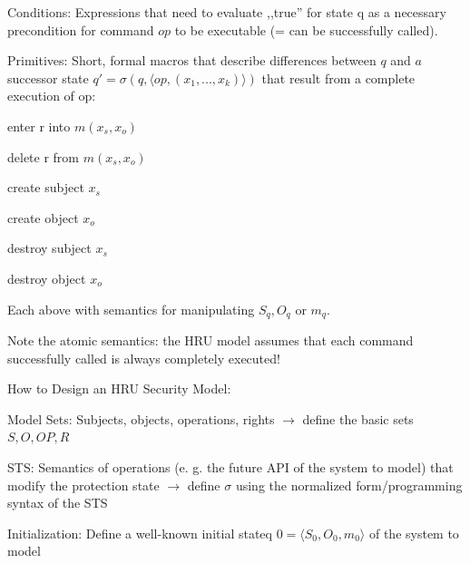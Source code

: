 \documentclass[a4paper]{article}
\begin{document}
\begin{multicols}{3}
    Conditions: Expressions that need to evaluate ,,true'' for state q as a necessary precondition for command $op$ to be executable (= can be successfully called).

    Primitives: Short, formal macros that describe differences between $q$ and $a$ successor state $q'=\sigma(q,\langle op,(x_1 ,...,x_k)\rangle )$ that result from a complete execution of op:
    \begin{itemize*}
        \item enter r into $m(x_s,x_o)$
        \item delete r from $m(x_s,x_o)$
        \item create subject $x_s$
        \item create object $x_o$
        \item destroy subject $x_s$
        \item destroy object $x_o$
        \item Each above with semantics for manipulating $S_q, O_q$ or $m_q$.
    \end{itemize*}

    Note the atomic semantics: the HRU model assumes that each command successfully called is always completely executed!

    How to Design an HRU Security Model:
    \begin{enumerate*}
        \item Model Sets: Subjects, objects, operations, rights $\rightarrow$ define the basic sets $S,O,OP,R$
        \item STS: Semantics of operations (e. g. the future API of the system to model) that modify the protection state $\rightarrow$ define $\sigma$ using the normalized form/programming syntax of the STS
        \item Initialization: Define a well-known initial stateq $0 =\langle S_0 ,O_0 ,m_0 \rangle$ of the system to model
    \end{enumerate*}


\end{multicols}
\end{document}
